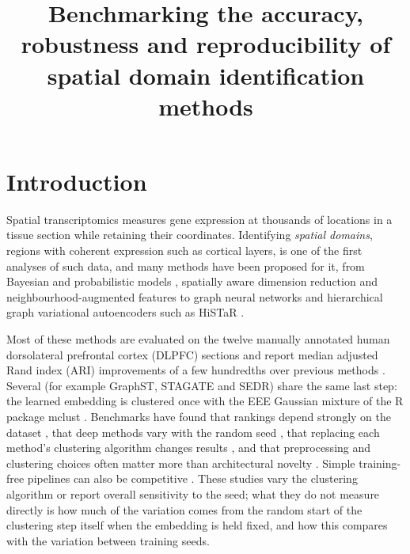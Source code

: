 \documentclass[unnumsec,webpdf,contemporary,large]{oup-authoring-template}
\title[Benchmarking spatial domain identification methods]{Benchmarking the accuracy, robustness and
reproducibility of spatial domain identification methods}
\author[1,$\ast$]{\todo{First Author}}
\author[1]{\todo{Second Author}}
\begin{document}
\maketitle

\section{Introduction}

Spatial transcriptomics measures gene expression at thousands of locations in a tissue section
while retaining their coordinates. Identifying \emph{spatial domains}, regions with coherent
expression such as cortical layers, is one of the first analyses of such data, and many methods
have been proposed for it, from Bayesian and probabilistic models \citep{zhao2021bayesspace,liu2023precast},
spatially aware dimension reduction \citep{shang2022spatialpca} and neighbourhood-augmented features
\citep{singhal2024banksy,varrone2024cellcharter,yuan2024mender} to graph neural networks
\citep{hu2021spagcn,dong2022stagate,long2023graphst} and hierarchical graph variational
autoencoders such as HiSTaR \citep{yu2025histar}.

Most of these methods are evaluated on the twelve manually annotated human dorsolateral prefrontal
cortex (DLPFC) sections \citep{maynard2021dlpfc} and report median adjusted Rand index (ARI) \citep{hubert1985ari}
improvements of a few hundredths over previous methods \citep{dong2022stagate,long2023graphst,yu2025histar}. Several
(for example GraphST, STAGATE and SEDR) share the same last step: the learned embedding is clustered once with the
EEE Gaussian mixture of the R package mclust \citep{scrucca2016mclust}. Benchmarks have found that rankings depend strongly
on the dataset \citep{yuan2024benchmark,nar2025bench}, that deep methods vary with the random seed \citep{hu2024gbbench}, that
replacing each method's clustering algorithm changes results \citep{nar2025bench}, and that preprocessing and clustering
choices often matter more than architectural novelty \citep{explanatory2026}. Simple training-free pipelines can also be
competitive \citep{nichepca2025,do2026graphbg}. These studies vary the clustering algorithm or report overall sensitivity to the seed; what they do not measure directly is how much of
the variation comes from the random start of the clustering step itself when the embedding is held fixed, and how this compares with the
variation between training seeds.
\end{document}
